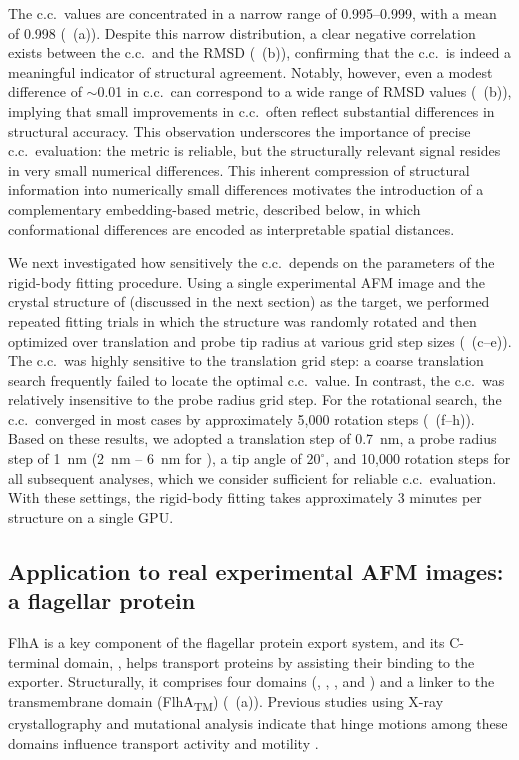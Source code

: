 The c.c.\ values are concentrated in a narrow range of 0.995--0.999, with a mean of 0.998 (~(a)). 
Despite this narrow distribution, a clear negative correlation exists between the c.c.\ and the RMSD (~(b)), confirming that the c.c.\ is indeed a meaningful indicator of structural agreement. 
Notably, however, even a modest difference of $\sim$0.01 in c.c.\ can correspond to a wide range of RMSD values (~(b)), implying that small improvements in c.c.\ often reflect substantial differences in structural accuracy. 
This observation underscores the importance of precise c.c.\ evaluation: the metric is reliable, but the structurally relevant signal resides in very small numerical differences.
This inherent compression of structural information into numerically small differences motivates the introduction of a complementary embedding-based metric, described below, in which conformational differences are encoded as interpretable spatial distances.

We next investigated how sensitively the c.c.\ depends on the parameters of the rigid-body fitting procedure. 
Using a single experimental AFM image and the crystal structure of \flhac (discussed in the next section) as the target, we performed repeated fitting trials in which the structure was randomly rotated and then optimized over translation and probe tip radius at various grid step sizes (~(c--e)). 
The c.c.\ was highly sensitive to the translation grid step: a coarse translation search frequently failed to locate the optimal c.c.\ value. 
In contrast, the c.c.\ was relatively insensitive to the probe radius grid step. 
For the rotational search, the c.c.\ converged in most cases by approximately 5,000 rotation steps (~(f--h)). 
Based on these results, we adopted a translation step of 0.7~nm, a probe radius step of 1~nm (2~nm -- 6~nm for \flhac), a tip angle of $20^{\circ}$, and 10,000 rotation steps for all subsequent analyses, which we consider sufficient for reliable c.c.\ evaluation.
With these settings, the rigid-body fitting takes approximately 3 minutes per structure on a single GPU.

\subsection{Application to real experimental AFM images: a flagellar protein \flhac}

FlhA is a key component of the flagellar protein export system, and its C-terminal domain, \flhac, helps transport proteins by assisting their binding to the exporter. 
Structurally, it comprises four domains (\acdi, \acdii, \acdiii, and \acdiv) and a linker to the transmembrane domain (FlhA\textsubscript{TM}) (~(a)). 
Previous studies using X-ray crystallography and mutational analysis indicate that hinge motions among these domains influence transport activity and motility \cite{saijo-hamano2010flha}. 

